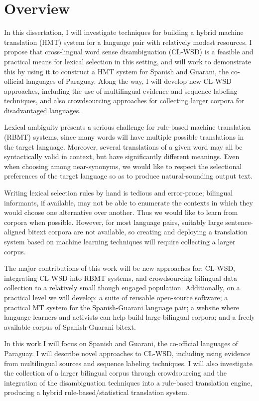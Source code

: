 \section{Overview}
In this dissertation, I will investigate techniques for building a hybrid
machine translation (HMT) system for a language pair with relatively modest
resources.
I propose that cross-lingual word sense disambiguation (CL-WSD) is a feasible
and practical means for lexical selection in this setting, and will work to
demonstrate this by using it to construct a HMT system for Spanish and Guarani,
the co-official languages of Paraguay.
Along the way, I will develop new CL-WSD approaches, including the use of
multilingual evidence and sequence-labeling techniques, and also crowdsourcing
approaches for collecting larger corpora for disadvantaged languages.

Lexical ambiguity presents a serious challenge for rule-based machine
translation (RBMT) systems, since many words will have multiple possible
translations in the target language. Moreover, several translations of a given
word may all be syntactically valid in context, but have significantly
different meanings. Even when choosing among near-synonyms, we would like to
respect the selectional preferences of the target language so as to produce
natural-sounding output text.

Writing lexical selection rules by hand is tedious and error-prone; bilingual
informants, if available, may not be able to enumerate the contexts in which
they would choose one alternative over another. Thus we would like to learn
from corpora when possible. However, for most language pairs, suitably large
sentence-aligned bitext corpora are not available, so creating and deploying a
translation system based on machine learning techniques will require collecting
a larger corpus.

The major contributions of this work will be new approaches for: CL-WSD,
integrating CL-WSD into RBMT systems, and crowdsourcing bilingual data
collection to a relatively small though engaged population.
Additionally, on a practical level we will develop: a suite of reusable
open-source software; a practical MT system for the Spanish-Guarani language
pair; a website where language learners and activists can help build large
bilingual corpora; and a freely available corpus of Spanish-Guarani bitext.

In this work I will focus on Spanish and Guarani, the co-official languages of
Paraguay.  I will describe novel approaches to CL-WSD, including using evidence
from multilingual sources and sequence labeling techniques.
I will also investigate the collection of a larger bilingual corpus through
crowdsourcing and the integration of the disambiguation techniques into a
rule-based translation engine, producing a hybrid rule-based/statistical
translation system.

